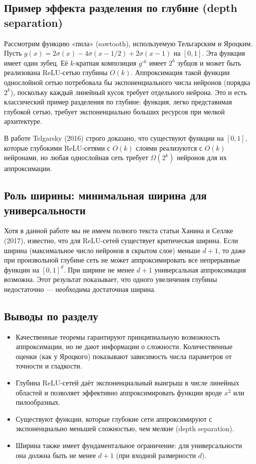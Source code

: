 \documentclass[12pt]{article}
\begin{document}
	\subsection{Пример эффекта разделения по глубине (depth separation)}
	
	Рассмотрим функцию «пила» (sawtooth), используемую Тельгарским и Яроцким. Пусть $g(x)=2\sigma(x)-4\sigma(x-1/2)+2\sigma(x-1)$ на $[0,1]$. Эта функция имеет один зубец. Её $k$-кратная композиция $g^{\circ k}$ имеет $2^k$ зубцов и может быть реализована ReLU-сетью глубины $O(k)$. Аппроксимация такой функции однослойной сетью потребовала бы экспоненциального числа нейронов (порядка $2^k$), поскольку каждый линейный кусок требует отдельного нейрона. Это и есть классический пример разделения по глубине: функция, легко представимая глубокой сетью, требует экспоненциально больших ресурсов при мелкой архитектуре.
	
	В работе Telgarsky (2016) строго доказано, что существуют функции на $[0,1]$, которые глубокими ReLU-сетями с $O(k)$ слоями реализуются с $O(k)$ нейронами, но любая однослойная сеть требует $\Omega(2^k)$ нейронов для их аппроксимации.
	
	\subsection{Роль ширины: минимальная ширина для универсальности}
	
	Хотя в данной работе мы не имеем полного текста статьи Ханина и Селлке (2017), известно, что для ReLU-сетей существует критическая ширина. Если ширина (максимальное число нейронов в скрытом слое) меньше $d+1$, то даже при произвольной глубине сеть не может аппроксимировать все непрерывные функции на $[0,1]^d$. При ширине не менее $d+1$ универсальная аппроксимация возможна. Этот результат показывает, что одного увеличения глубины недостаточно — необходима достаточная ширина.
	
	\subsection{Выводы по разделу}
	
	\begin{itemize}
		\item Качественные теоремы гарантируют принципиальную возможность аппроксимации, но не дают информации о сложности. Количественные оценки (как у Яроцкого) показывают зависимость числа параметров от точности и гладкости.
		\item Глубина ReLU-сетей даёт экспоненциальный выигрыш в числе линейных областей и позволяет эффективно аппроксимировать функции вроде $x^2$ или пилообразных.
		\item Существуют функции, которые глубокие сети аппроксимируют с экспоненциально меньшей сложностью, чем мелкие (depth separation).
		\item Ширина также имеет фундаментальное ограничение: для универсальности она должна быть не менее $d+1$ (при входной размерности $d$).
	\end{itemize}
	
\end{document}
